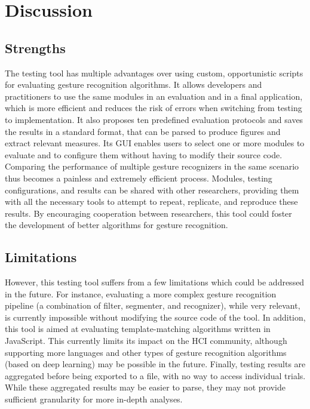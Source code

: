 \section{Discussion} \label{sec:quantumleap-testing:discussion}
\subsection{Strengths} \label{sec:quantumleap-testing:discussion:strengths}
The \ql testing tool has multiple advantages over using custom, opportunistic scripts for evaluating gesture recognition algorithms.
%
It allows developers and practitioners to use the same modules in an evaluation and in a final application, which is more efficient and reduces the risk of errors when switching from testing to implementation.
%
It also proposes ten predefined evaluation protocols and saves the results in a standard format, that can be parsed to produce figures and extract relevant measures.
%
Its GUI enables users to select one or more modules to evaluate and to configure them without having to modify their source code. Comparing the performance of multiple gesture recognizers in the same scenario thus becomes a painless and extremely efficient process.
%
Modules, testing configurations, and results can be shared with other researchers, providing them with all the necessary tools to attempt to repeat, replicate, and reproduce these results. By encouraging cooperation between researchers, this tool could foster the development of better algorithms for gesture recognition.

\subsection{Limitations} \label{sec:quantumleap-testing:discussion:limitations}
However, this testing tool suffers from a few limitations which could be addressed in the future.
%
For instance, evaluating a more complex gesture recognition pipeline (\eg a combination of filter, segmenter, and recognizer), while very relevant, is currently impossible without modifying the source code of the tool.
%
In addition, this tool is aimed at evaluating template-matching algorithms written in JavaScript. This currently limits its impact on the HCI community, although supporting more languages and other types of gesture recognition algorithms (\eg based on deep learning) may be possible in the future.
%
Finally, testing results are aggregated before being exported to a file, with no way to access individual trials. While these aggregated results may be easier to parse, they may not provide sufficient granularity for more in-depth analyses.

